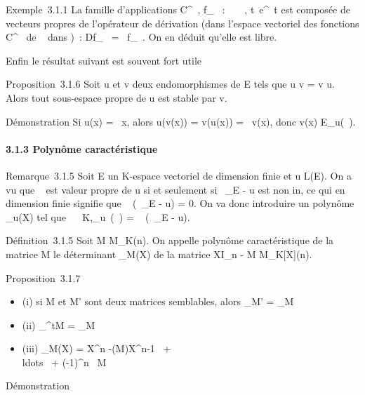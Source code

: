 \documentclass[]{article}
\begin{document}
Exemple~3.1.1 La famille d'applications C^\infty~, f\_\lambda~ : ~
\rightarrow~ , t\mapsto~e^\lambda~t est composée de
vecteurs propres de l'opérateur de dérivation (dans l'espace vectoriel
des fonctions C^\infty~ de ~ dans )~: Df\_\lambda~ =
\lambda~f\_\lambda~. On en déduit qu'elle est libre.

Enfin le résultat suivant est souvent fort utile

Proposition~3.1.6 Soit u et v deux endomorphismes de E tels que u \cdot v =
v \cdot u. Alors tout sous-espace propre de u est stable par v.

Démonstration Si u(x) = \lambda~x, alors u(v(x)) = v(u(x)) = \lambda~v(x), donc v(x) \in
E\_u(\lambda~).

\paragraph{3.1.3 Polynôme caractéristique}

Remarque~3.1.5 Soit E un K-espace vectoriel de dimension finie et u \in
L(E). On a vu que \lambda~ est valeur propre de u si et seulement si
\lambda~\mathrmId\_E - u est non in\jmathectif, ce qui en
dimension finie signifie que
~
(\lambda~\mathrmId\_E - u) = 0. On va donc
introduire un polynôme \chi\_u(X) tel que
\forall~\lambda~ \in K,\chi\_u~(\lambda~)
= ~
(\lambda~\mathrmId\_E - u).

Définition~3.1.5 Soit M \in M\_K(n). On appelle polynôme
caractéristique de la matrice M le déterminant \chi\_M(X) de la
matrice XI\_n - M \in M\_K{[}X{]}(n).

Proposition~3.1.7

\begin{itemize}
\itemsep1pt\parskip0pt
\item
  (i) si M et M' sont deux matrices semblables, alors \chi\_M' =
  \chi\_M
\item
  (ii) \chi\_^tM = \chi\_M
\item
  (iii) \chi\_M(X) = X^n
  -(M)X^n-1~
  + \\ldots~ +
  (-1)^n\
   M
\end{itemize}

Démonstration
\end{document}
